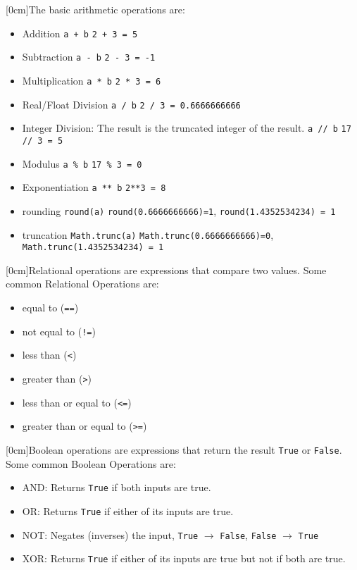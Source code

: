   [0cm]The basic arithmetic operations are:
  \begin{itemize}
    \setlength\itemsep{0em}
    \item Addition \verb|a + b|
      \subitem \verb|2 + 3 = 5|
    \item Subtraction \verb|a - b|
      \subitem \verb|2 - 3 = -1|
    \item Multiplication \verb|a * b|
      \subitem \verb|2 * 3 = 6|
    \item Real/Float Division \verb|a / b|
      \subitem \verb|2 / 3 = 0.6666666666|
    \item Integer Division: The result is the truncated integer of the result. \verb|a // b|
      \subitem \verb|17 // 3 = 5|
    \item Modulus \verb|a % b|
      \subitem \verb|17 % 3 = 0|
    \item Exponentiation \verb|a ** b|
      \subitem \verb|2**3 = 8|
    \item rounding \verb|round(a)|
      \subitem \verb|round(0.6666666666)=1|, \verb|round(1.4352534234) = 1|
    \item truncation \verb|Math.trunc(a)|
      \subitem \verb|Math.trunc(0.6666666666)=0|, \verb|Math.trunc(1.4352534234) = 1|
  \end{itemize}
  [0cm]Relational operations are expressions that compare two values. Some common Relational Operations are:
  \begin{itemize}
    \setlength\itemsep{0em}
    \item equal to (\verb|==|)
    \item not equal to (\verb|!=|)
    \item less than (\verb|<|)
    \item greater than (\verb|>|)
    \item less than or equal to (\verb|<=|)
    \item greater than or equal to (\verb|>=|)
  \end{itemize}
  [0cm]Boolean operations are expressions that return the result \verb|True| or \verb|False|. Some common Boolean Operations are:
  \begin{itemize}
    \setlength\itemsep{0em}
    \item AND: Returns \verb|True| if both inputs are true.
    \item OR: Returns \verb|True| if either of its inputs are true.
    \item NOT: Negates (inverses) the input, \verb|True| $\to$ \verb|False|, \verb|False| $\to$ \verb|True|
    \item XOR: Returns \verb|True| if either of its inputs are true but not if both are true.
  \end{itemize}
